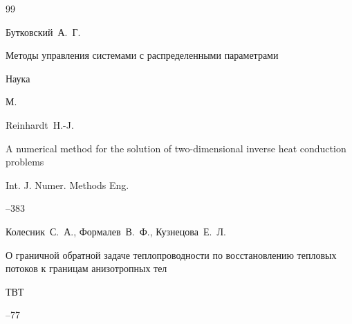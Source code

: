 \begin{thebibliography}{99}







\by Бутковский~А.~Г. 

\book Методы управления системами с распределенными параметрами


\publ Наука

\publaddr М.













\by Reinhardt~H.-J.

\paper A numerical method for the solution of two-dimensional inverse heat conduction problems

\jour Int. J. Numer. Methods Eng.




--383





\by Колесник~С.~А., Формалев~В.~Ф., Кузнецова~Е.~Л.

\paper О граничной обратной задаче теплопроводности по восстановлению тепловых потоков к границам анизотропных тел

\jour ТВТ




--77



\end{thebibliography}
